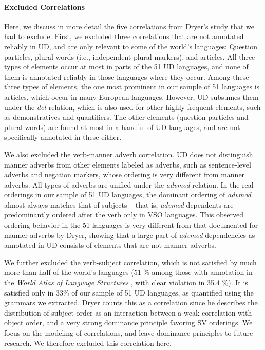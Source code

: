 \documentclass[10pt,twoside,lineno]{article}
\begin{document}
\paragraph{Excluded Correlations}
Here, we discuss in more detail the five correlations from Dryer's study that we had to exclude.
First, we excluded three correlations that are not annotated reliably in UD, and are only relevant to some of the world's languages: Question particles, plural words (i.e., independent plural markers), and articles.
All three types of elements occur at most in parts of the 51 UD languages, and none of them is annotated reliably in those languages where they occur.
Among these three types of elements, the one most prominent in our sample of 51 languages is articles, which occur in many European languages.
However, UD subsumes them under the \emph{det} relation, which is also used for other highly frequent elements, such as demonstratives and quantifiers.
The other elements (question particles and plural words) are found at most in a handful of UD languages, and are not specifically annotated in these either.

We also excluded the verb-manner adverb correlation.
UD does not distinguish manner adverbs from other elements labeled as adverbs, such as sentence-level adverbs and negation markers, whose ordering is very different from manner adverbs.
All types of adverbs are unified under the \emph{advmod} relation.
In the real orderings in our sample of 51 UD languages, the dominant ordering of \emph{advmod} almost always matches that of subjects -- that is, \emph{advmod} dependents are predominantly ordered after the verb only in VSO languages.
This observed ordering behavior in the 51 languages is very different from that documented for manner adverbs by Dryer, showing that a large part of \emph{advmod} dependencies as annotated in UD consists of elements that are not manner adverbs.



We further excluded the verb-subject correlation, which is not satisfied by much more than half of the world's languages (51 \% among those with annotation in the \emph{World Atlas of Language Structures} \cite{wals-81}, with clear violation in 35.4 \%).
It is satisfied only in 33\% of our sample of 51 UD languages, as quantified using the grammars we extracted.
Dryer \cite{dryer1992greenbergian} counts this as a correlation since he describes the distribution of subject order as an interaction between a weak correlation with object order, and a very strong dominance principle favoring SV orderings.
We focus on the modeling of correlations, and leave dominance principles to future research.
We therefore excluded this correlation here.
\end{document}
